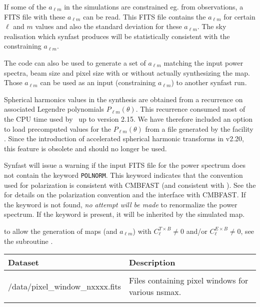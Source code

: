 \begin{codedescription}
{If some of the $a_{\ell m}$ in the simulations are constrained eg. from observations, a FITS file
with these $a_{\ell m}$ can be read. This FITS file contains 
the $a_{\ell m}$ for certain $\ell$ and $m$ values
and also the standard deviation for these $a_{\ell m}$. The sky
realisation which synfast produces will be statistically consistent
with the constraining $a_{\ell m}$.

The code can also be used
to generate a set of $a_{\ell m}$ matching the input power spectra, beam size and
pixel size with or without actually synthesizing the map. Those $a_{\ell m}$ can be
used as an input (constraining $a_{\ell m}$) to another synfast run.
\\
}
\end{codedescription}
%
\begin{cd_contd}
{
Spherical harmonics values in the synthesis are obtained from a
recurrence on associated Legendre polynomials $P_{\ell m}(\theta)$. 
This recurrence consumed most of the CPU time used by \thedocid\ up to version
2.15. We have therefore included an option to load precomputed values for the
$P_{\ell m}(\theta)$ from a file generated by the \healpix facility
. Since the introduction of accelerated spherical
harmonic transforms in \healpix v2.20, this feature is obsolete and should no
longer be used. 

Synfast will issue a warning if the input FITS file for the power spectrum does
not contain the keyword {\tt POLNORM}. This keyword indicates that the convention
used for polarization is consistent with CMBFAST (and consistent with ). See the 
for details on the
polarization convention and the interface with CMBFAST. If the
keyword is not found, {\em no attempt will be made} to renormalize the power
spectrum. 
If the keyword is present, it will be inherited by the simulated map.

 to allow the generation of maps (and $a_{\ell m}$) with $C^{T\times B}_{\ell} \ne 0$ and/or $C^{E\times B}_{\ell} \ne 0$,
see the subroutine .
}
\end{cd_contd}


\begin{datasets}
{
\begin{tabular}{p{0.3\hsize} p{0.35\hsize}} \hline  
  \textbf{Dataset} & \textbf{Description} \\ \hline
                   &                      \\ %
  /data/pixel\_window\_nxxxx.fits & Files containing pixel windows for
                   various nsmax.\\ 
                   &                      \\ \hline %
\end{tabular}
} 
\end{datasets}

